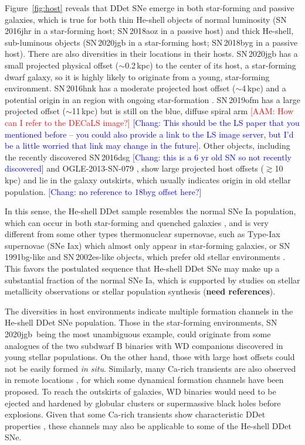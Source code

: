 \documentclass[twocolumn]{aastex631}
\newcommand{\sn}{SN\,2020jgb}
\newcommand{\adam}[1]{\textcolor{red}{[AAM: #1]}}
\newcommand{\chang}[1]{\textcolor{blue}{[Chang: #1]}}
\begin{document}
Figure~\ref{fig:host} reveals that DDet SNe emerge in both star-forming and passive galaxies, which is true for both thin He-shell objects of normal luminosity (SN\,2016jhr in a star-forming host; SN\,2018aoz in a passive host) and thick He-shell, sub-luminous objects (SN\,2020jgb in a star-forming host; SN\,2018byg in a passive host). There are also diversities in their locations in their hosts. SN\,2020jgb has a small projected physical offset ($\sim$0.2\,kpc) to the center of its host, a star-forming dwarf galaxy, so it is highly likely to originate from a young, star-forming environment. SN\,2016hnk has a moderate projected host offset ($\sim$4\,kpc) and a potential origin in an  region with ongoing star-formation \citep{galbany_16hnk_2019}. SN\,2019ofm has a large projected offset ($\sim$11\,kpc) but is still on the blue, diffuse spiral arm \adam{How can I refer to the DECaLS image?} \chang{This should be the LS paper that you mentioned before -- you could also provide a link to the LS image server, but I'd be a little worried that link may change in the future}. Other objects, including the recently discovered SN\,2016dsg \chang{this is a 6 yr old SN so not recently discovered} and OGLE-2013-SN-079 \citep{Dong_16dsg_2022}, show large projected host offsets ($\gtrsim$10\,kpc) and lie in the galaxy outskirts, which usually indicates origin in old stellar population. \chang{no reference to 18byg offset here?}

In this sense, the He-shell DDet sample resembles the normal SNe Ia population, which can occur in both star-forming and quenched galaxies \citep[e.g.,][]{Sullivan_2006, Smith_2012}, and is very different from some other types thermonuclear supernovae, such as Type-Iax supernovae (SNe Iax) which almost only appear in star-forming galaxies, or SN\,1991bg-like and SN\,2002es-like objects, which prefer old stellar environments \citep[see the review in][]{Jha_2019}. This favors the postulated sequence that He-shell DDet SNe may make up a substantial fraction of the normal SNe Ia, which is supported by studies on stellar metallicity observations \citep{Sanders_2021, Eitner_2022} or stellar population synthesis (\textbf{need references}).

The diversities in host environments indicate multiple formation channels in the He-shell DDet SNe population. Those in the star-forming environments, \sn\ being the most unambiguous example, could originate from some analogues of the two subdwarf B binaries with WD companions \citep{Geier_2013, Kupfer_2022} discovered in young stellar populations.
On the other hand, those with large host offsets could not be easily formed {\it in situ}. Similarly, many Ca-rich transients are also observed in remote locations \citep{Lunnan_2017}, for which some dynamical formation channels have been proposed. To reach the outskirts of galaxies, WD binaries would need to be ejected and hardened by globular clusters \citep{Shen_2019} or supermassive black holes \citep{Foley_2015} before explosions. Given that some Ca-rich transients show characteristic DDet properties \citep{de_Ca_rich_2020}, these channels may also be applicable to some of the He-shell DDet SNe. 
\end{document}
